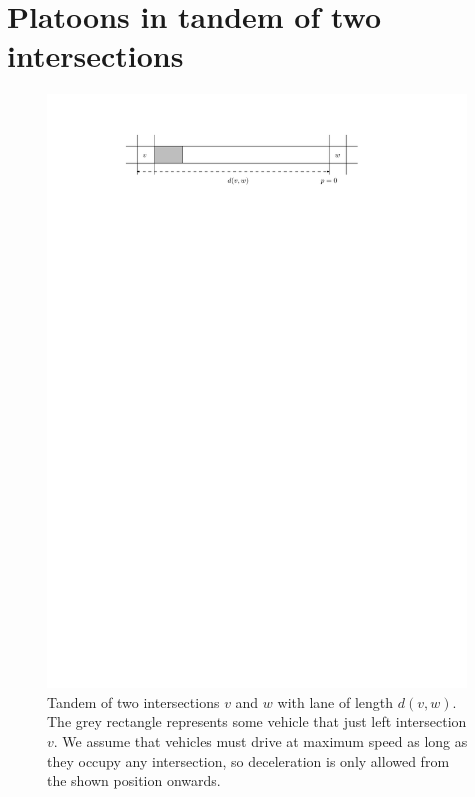 \documentclass[a4paper]{article}
\theoremstyle{definition}
\theoremstyle{plain}
\begin{document}
\newpage
\section{Platoons in tandem of two intersections}

\begin{figure}
  \centering
  \includegraphics[width=0.99\textwidth]{figures/motion/tandem}
  \caption{Tandem of two intersections $v$ and $w$ with lane of length $d(v,w)$.
    The grey rectangle represents some vehicle that just left intersection $v$.
    We assume that vehicles must drive at maximum speed as long as they occupy
    any intersection, so deceleration is only allowed from the shown position
    onwards.}
  \label{fig:tandem}
\end{figure}
\end{document}
